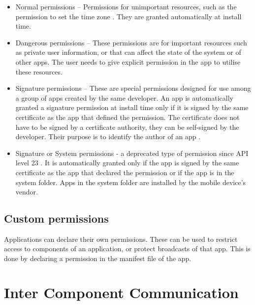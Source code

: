     \begin{itemize}
        \item Normal permissions – Permissions for unimportant resources, such as the permission to set the time zone \cite{permissions_guide}. They are granted automatically at install time.
        \item Dangerous permissions – These permissions are for important resources such as private user information, or that can affect the state of the system or of other apps. The user needs to give explicit permission in the app to utilise these resources.
        \item Signature permissions – These are special permissions designed for use among a group of apps created by the same developer. An app is automatically granted a signature permission at install time only if it is signed by the same certificate as the app that defined the permission. The certificate does not have to be signed by a certificate authority, they can be self-signed by the developer. Their purpose is to identify the author of an app \cite{define_custom_permission}.
        \item Signature or System permissions - a deprecated type of permission since API level 23 \cite{manifest_permissions_element}. It is automatically granted only if the app is signed by the same certificate as the app that declared the permission or if the app is in the system folder. Apps in the system folder are installed by the mobile device’s vendor.
    \end{itemize}
    
    \subsection{Custom permissions}
        \label{subsec:custom_permissions}
        
    Applications can declare their own permissions. These can be used to restrict access to components of an application, or protect broadcasts of that app. This is done by declaring a permission in the manifest file of the app.
    
    
    
    \section{Inter Component Communication}
        \label{sec:inter_component_communication}
    
